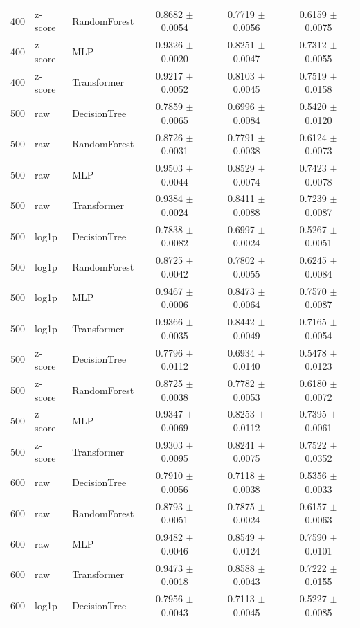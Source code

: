 \begin{longtable}{rllccc}
400 & z-score & RandomForest & 0.8682 $\pm$ 0.0054 & 0.7719 $\pm$ 0.0056 & 0.6159 $\pm$ 0.0075 \\
400 & z-score & MLP & 0.9326 $\pm$ 0.0020 & 0.8251 $\pm$ 0.0047 & 0.7312 $\pm$ 0.0055 \\
400 & z-score & Transformer & 0.9217 $\pm$ 0.0052 & 0.8103 $\pm$ 0.0045 & 0.7519 $\pm$ 0.0158 \\
500 & raw & DecisionTree & 0.7859 $\pm$ 0.0065 & 0.6996 $\pm$ 0.0084 & 0.5420 $\pm$ 0.0120 \\
500 & raw & RandomForest & 0.8726 $\pm$ 0.0031 & 0.7791 $\pm$ 0.0038 & 0.6124 $\pm$ 0.0073 \\
500 & raw & MLP & 0.9503 $\pm$ 0.0044 & 0.8529 $\pm$ 0.0074 & 0.7423 $\pm$ 0.0078 \\
500 & raw & Transformer & 0.9384 $\pm$ 0.0024 & 0.8411 $\pm$ 0.0088 & 0.7239 $\pm$ 0.0087 \\
500 & log1p & DecisionTree & 0.7838 $\pm$ 0.0082 & 0.6997 $\pm$ 0.0024 & 0.5267 $\pm$ 0.0051 \\
500 & log1p & RandomForest & 0.8725 $\pm$ 0.0042 & 0.7802 $\pm$ 0.0055 & 0.6245 $\pm$ 0.0084 \\
500 & log1p & MLP & 0.9467 $\pm$ 0.0006 & 0.8473 $\pm$ 0.0064 & 0.7570 $\pm$ 0.0087 \\
500 & log1p & Transformer & 0.9366 $\pm$ 0.0035 & 0.8442 $\pm$ 0.0049 & 0.7165 $\pm$ 0.0054 \\
500 & z-score & DecisionTree & 0.7796 $\pm$ 0.0112 & 0.6934 $\pm$ 0.0140 & 0.5478 $\pm$ 0.0123 \\
500 & z-score & RandomForest & 0.8725 $\pm$ 0.0038 & 0.7782 $\pm$ 0.0053 & 0.6180 $\pm$ 0.0072 \\
500 & z-score & MLP & 0.9347 $\pm$ 0.0069 & 0.8253 $\pm$ 0.0112 & 0.7395 $\pm$ 0.0061 \\
500 & z-score & Transformer & 0.9303 $\pm$ 0.0095 & 0.8241 $\pm$ 0.0075 & 0.7522 $\pm$ 0.0352 \\
600 & raw & DecisionTree & 0.7910 $\pm$ 0.0056 & 0.7118 $\pm$ 0.0038 & 0.5356 $\pm$ 0.0033 \\
600 & raw & RandomForest & 0.8793 $\pm$ 0.0051 & 0.7875 $\pm$ 0.0024 & 0.6157 $\pm$ 0.0063 \\
600 & raw & MLP & 0.9482 $\pm$ 0.0046 & 0.8549 $\pm$ 0.0124 & 0.7590 $\pm$ 0.0101 \\
600 & raw & Transformer & 0.9473 $\pm$ 0.0018 & 0.8588 $\pm$ 0.0043 & 0.7222 $\pm$ 0.0155 \\
600 & log1p & DecisionTree & 0.7956 $\pm$ 0.0043 & 0.7113 $\pm$ 0.0045 & 0.5227 $\pm$ 0.0085 \\

\end{longtable}
